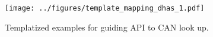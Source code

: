 \begin{figure}[t]
    \centering
    \texttt{[image: ../figures/template\_mapping\_dhas\_1.pdf]}
    \caption{Templatized examples for guiding API to CAN look up.}
    \label{fig:template-mapping}
\end{figure}
